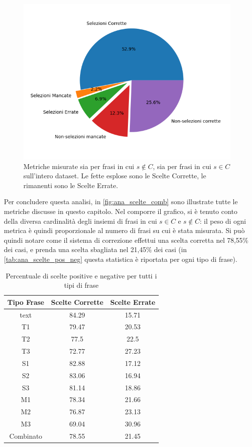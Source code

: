 \begin{figure}[H]
\centering
\includegraphics[width=\textwidth]{immagini/analisi/overview_scelte_combinato}
\caption{Metriche misurate sia per frasi in cui $s \not\in C$, sia per frasi in cui  $s\in C$ sull'intero dataset. Le fette esplose sono le Scelte Corrette, le rimanenti sono le Scelte Errate. }
\label{fig:ana_scelte_comb}
\end{figure}
\noindent
Per concludere questa analisi, in \autoref{fig:ana_scelte_comb} sono illustrate tutte le metriche discusse in questo capitolo. Nel comporre il grafico, si è tenuto conto della diversa cardinalità degli insiemi di frasi in cui $s\in C$ e $s\not\in C$: il peso di ogni metrica è quindi proporzionale al numero di frasi su cui è stata misurata. Si può quindi notare come il sistema di correzione effettui una scelta corretta nel 78,55\% dei casi, e prenda una scelta sbagliata nel 21,45\% dei casi (in \autoref{tab:ana_scelte_pos_neg} questa statistica è riportata per ogni tipo di frase).

\begin{table}[H]
\centering
\begin{tabular}{ccc}
\textbf{Tipo Frase} & \textbf{Scelte Corrette} & \textbf{Scelte Errate} \\ \hline
text& 84.29& 15.71\\
T1& 79.47& 20.53\\
T2& 77.5& 22.5\\
T3& 72.77& 27.23\\
S1& 82.88& 17.12\\
S2& 83.06& 16.94\\
S3& 81.14& 18.86\\
M1& 78.34& 21.66\\
M2& 76.87& 23.13\\
M3& 69.04& 30.96\\
Combinato& 78.55& 21.45\\
\end{tabular}
\caption{Percentuale di scelte positive e negative per tutti i tipi di frase}
\label{tab:ana_scelte_pos_neg}
\end{table}



